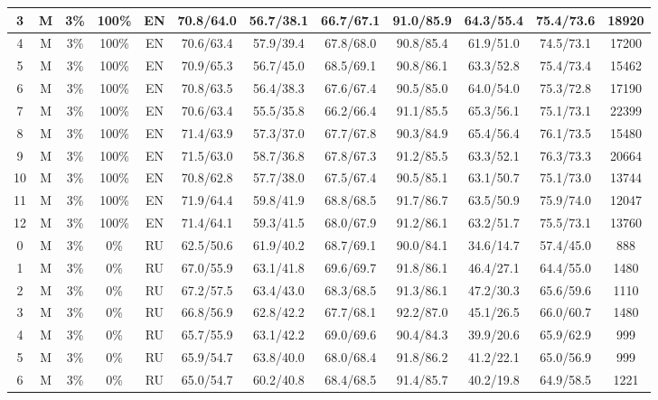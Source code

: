 \begin{table*}
{\begin{tabular}{|c|c|c|c|c||c|c|c|c|c|c||c|}
3 & M & 3\% & 100\% & EN & 70.8/64.0 & 56.7/38.1 & 66.7/67.1 & 91.0/85.9 & 64.3/55.4 & 75.4/73.6 & 18920 \\ \hline
4 & M & 3\% & 100\% & EN & 70.6/63.4 & 57.9/39.4 & 67.8/68.0 & 90.8/85.4 & 61.9/51.0 & 74.5/73.1 & 17200 \\ \hline
5 & M & 3\% & 100\% & EN & 70.9/65.3 & 56.7/45.0 & 68.5/69.1 & 90.8/86.1 & 63.3/52.8 & 75.4/73.4 & 15462 \\ \hline
6 & M & 3\% & 100\% & EN & 70.8/63.5 & 56.4/38.3 & 67.6/67.4 & 90.5/85.0 & 64.0/54.0 & 75.3/72.8 & 17190 \\ \hline
7 & M & 3\% & 100\% & EN & 70.6/63.4 & 55.5/35.8 & 66.2/66.4 & 91.1/85.5 & 65.3/56.1 & 75.1/73.1 & 22399 \\ \hline
8 & M & 3\% & 100\% & EN & 71.4/63.9 & 57.3/37.0 & 67.7/67.8 & 90.3/84.9 & 65.4/56.4 & 76.1/73.5 & 15480 \\ \hline
9 & M & 3\% & 100\% & EN & 71.5/63.0 & 58.7/36.8 & 67.8/67.3 & 91.2/85.5 & 63.3/52.1 & 76.3/73.3 & 20664 \\ \hline
10 & M & 3\% & 100\% & EN & 70.8/62.8 & 57.7/38.0 & 67.5/67.4 & 90.5/85.1 & 63.1/50.7 & 75.1/73.0 & 13744 \\ \hline
11 & M & 3\% & 100\% & EN & 71.9/64.4 & 59.8/41.9 & 68.8/68.5 & 91.7/86.7 & 63.5/50.9 & 75.9/74.0 & 12047 \\ \hline
12 & M & 3\% & 100\% & EN & 71.4/64.1 & 59.3/41.5 & 68.0/67.9 & 91.2/86.1 & 63.2/51.7 & 75.5/73.1 & 13760 \\ \hline
0 & M & 3\% & 0\% & RU & 62.5/50.6 & 61.9/40.2 & 68.7/69.1 & 90.0/84.1 & 34.6/14.7 & 57.4/45.0 & 888 \\ \hline
1 & M & 3\% & 0\% & RU & 67.0/55.9 & 63.1/41.8 & 69.6/69.7 & 91.8/86.1 & 46.4/27.1 & 64.4/55.0 & 1480 \\ \hline
2 & M & 3\% & 0\% & RU & 67.2/57.5 & 63.4/43.0 & 68.3/68.5 & 91.3/86.1 & 47.2/30.3 & 65.6/59.6 & 1110 \\ \hline
3 & M & 3\% & 0\% & RU & 66.8/56.9 & 62.8/42.2 & 67.7/68.1 & 92.2/87.0 & 45.1/26.5 & 66.0/60.7 & 1480 \\ \hline
4 & M & 3\% & 0\% & RU & 65.7/55.9 & 63.1/42.2 & 69.0/69.6 & 90.4/84.3 & 39.9/20.6 & 65.9/62.9 & 999 \\ \hline
5 & M & 3\% & 0\% & RU & 65.9/54.7 & 63.8/40.0 & 68.0/68.4 & 91.8/86.2 & 41.2/22.1 & 65.0/56.9 & 999 \\ \hline
6 & M & 3\% & 0\% & RU & 65.0/54.7 & 60.2/40.8 & 68.4/68.5 & 91.4/85.7 & 40.2/19.8 & 64.9/58.5 & 1221 \\ \hline

\end{tabular}}
\end{table*}
